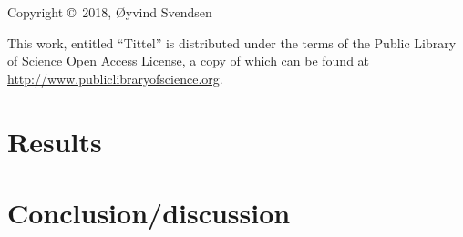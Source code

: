 \documentclass[a4, 12pt]{book}
\title{\mintittel}
\author{\O yvind Svendsen}
\date{01.06.18}
\newcommand{\mintittel}{Tittel}
\begin{document}

\vspace*{18cm}
\noindent Copyright \copyright$\,$ 2018, \O yvind Svendsen
\vspace{4mm}

\noindent This work, entitled ``\mintittel'' is distributed under the
terms of the Public Library of Science Open Access License, a copy of which can be found at \url{http://www.publiclibraryofscience.org}. 

\iffalse

%
%

\chapter{Introduction}


\chapter{Theory Part I \comment{(need to rename)} }





\chapter{Theory Part II \comment{(need to rename)}}
\comment{Describe analytical models, numerical models (omega), simulations (eris) and that I compare the two latter}
\comment{Results from omega can be compared to hydrodynamical simulations like eris. Which are much more detialed and precise, but also more computationally expensive.}



\chapter{Methodology}

%
%

\fi

\chapter{Results}


\chapter{Conclusion/discussion}



\end{document}
